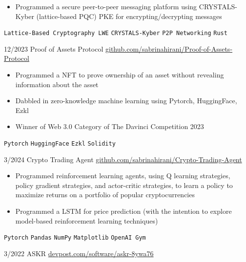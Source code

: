 \documentclass[9pt]{developercv} %
\begin{document}
\begin{entrylist}
{\begin{itemize}[itemsep=3pt,topsep=0pt,parsep=0pt,partopsep=0pt, leftmargin=-1pt]
            \item Programmed a secure peer-to-peer messaging platform using CRYSTALS-Kyber (lattice-based PQC) PKE for encrypting/decrypting messages
        \end{itemize} 
        \vspace{5pt}
        \texttt{Lattice-Based Cryptography LWE} \slashsep \texttt{CRYSTALS-Kyber} \slashsep \texttt{P2P Networking} \slashsep \texttt{Rust}
        }
    \entry
		{12/2023}
		{Proof of Assets Protocol}
		{\href{https://github.com/sabrinahirani/Proof-of-Assets-Protocol}{github.com/sabrinahirani/Proof-of-Assets-Protocol}}
		{
        \vspace{-10pt}
        \begin{itemize}[itemsep=3pt,topsep=0pt,parsep=0pt,partopsep=0pt, leftmargin=-1pt]
            \item Programmed a NFT to prove ownership of an asset without revealing information about the asset
            \item Dabbled in zero-knowledge machine learning using Pytorch, HuggingFace, Ezkl
            \item Winner of Web 3.0 Category of The Davinci Competition 2023
        \end{itemize} 
        \vspace{5pt}
        \texttt{Pytorch} \slashsep \texttt{HuggingFace} \slashsep \texttt{Ezkl} \slashsep \texttt{Solidity}
        }
    \entry
		{3/2024}
		{Crypto Trading Agent}
		{\href{https://github.com/sabrinahirani/Crypto-Trading-Agent}{github.com/sabrinahirani/Crypto-Trading-Agent}}
		{
        \vspace{-10pt}
        \begin{itemize}[itemsep=3pt,topsep=0pt,parsep=0pt,partopsep=0pt, leftmargin=-1pt]
            \item Programmed reinforcement learning agents, using Q learning strategies, policy gradient strategies, and actor-critic strategies, to learn a policy to maximize returns on a portfolio of popular cryptocurrencies
            \item Programmed a LSTM for price prediction (with the intention to explore model-based reinforcement learning techniques)
        \end{itemize} 
        \vspace{5pt}
        \texttt{Pytorch} \slashsep \texttt{Pandas} \slashsep \texttt{NumPy} \slashsep \texttt{Matplotlib} \slashsep \texttt{OpenAI Gym}
        }
    \entry
		{3/2022}
		{ASKR}
		{\href{https://devpost.com/software/askr-8ywa76}{devpost.com/software/askr-8ywa76}}

\end{entrylist}
\end{document}
